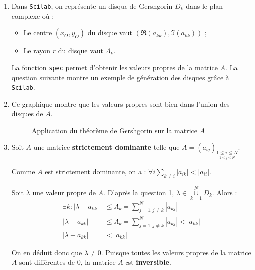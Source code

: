 \documentclass[a4paper,11pt]{article}
\theoremstyle{nonumberplain}
\theoremstyle{nonumberplain}
\begin{document}
\begin{enumerate}
        \item
        Dans \texttt{Scilab}, on représente un disque de Gershgorin $D_{k}$ dans le plan complexe où :
        \begin{itemize}
            \item
            Le centre $(x_{O}, y_{O})$ du disque vaut $(\Re(a_{kk}), \Im(a_{kk}))$ ;

            \item
            Le rayon $r$ du disque vaut $\Lambda_{k}$.
        \end{itemize}

        La fonction \texttt{spec} permet d'obtenir les valeurs propres de la matrice $A$.
        La question suivante montre un exemple de génération des disques grâce à \texttt{Scilab}.

        \item
        Ce graphique montre que les valeurs propres sont bien dans l'union des disques de $A$.
        \begin{figure}[H]
            \centering
            \caption{\label{graph_exo7} Application du théorème de Gershgorin sur la matrice $A$}
        \end{figure}

        \item
        Soit $A$ une matrice \textbf{strictement dominante} telle que $A = (a_{ij})_{\underset {1 \leq j \leq N}{1 \leq i \leq N}}$.

        Comme $A$ est strictement dominante, on a : $\forall i \sum\limits_{k \ne i}^{} |a_{ik}| < |a_{ii}|$.

        Soit $\lambda$ une valeur propre de $A$. D'après la question 1, $\lambda \in \underset{k = 1}{\overset{N}{\cup}} D_{k}$. Alors :
        \begin{equation*}
            \begin{split}
                \exists k : |\lambda - a_{kk}| & \leq \Lambda_{k} = \sum\limits_{j=1, j\ne k}^{N} |a_{kj}| \\
                            |\lambda - a_{kk}| & \leq \Lambda_{k} = \sum\limits_{j=1, j\ne k}^{N} |a_{kj}| < |a_{kk}| \\
                            |\lambda - a_{kk}| & < |a_{kk}|
            \end{split}
        \end{equation*}

        On en déduit donc que $\lambda \ne 0$. Puisque toutes les valeurs propres de la matrice $A$ sont différentes de $0$, la matrice $A$ est \textbf{inversible}.
    \end{enumerate}
\end{document}
